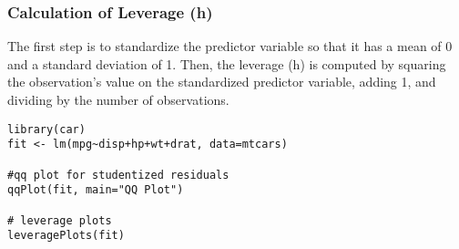 \documentclass[residuals.tex]{subfiles}
\begin{document}
\subsubsection{Calculation of Leverage (h)}
The first step is to standardize the predictor variable so that it has a mean of 0 and a standard deviation of 1. 
Then, the leverage (h) is computed by squaring the observation's value on the standardized predictor variable, adding 1, 
and dividing by the number of observations.



\begin{framed}
\begin{verbatim}
library(car)
fit <- lm(mpg~disp+hp+wt+drat, data=mtcars) 

#qq plot for studentized residuals
qqPlot(fit, main="QQ Plot")  

# leverage plots
leveragePlots(fit) 

\end{verbatim}
\end{framed}
\end{document}
